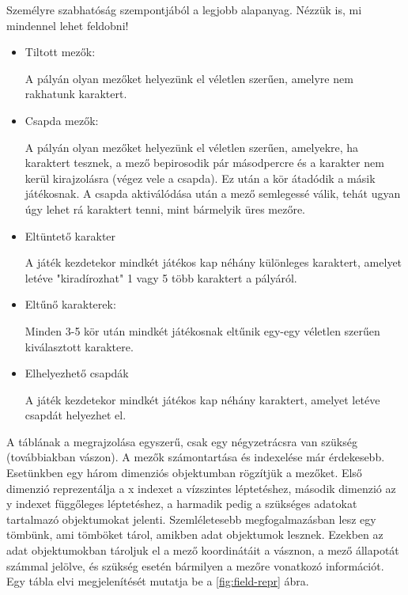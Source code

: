 
Személyre szabhatóság szempontjából a legjobb alapanyag. Nézzük is, mi mindennel lehet feldobni!
\begin{itemize}
	
	\item Tiltott mezők:
	
	A pályán olyan mezőket helyezünk el véletlen szerűen, amelyre nem rakhatunk karaktert.
	\item Csapda mezők:
	
	A pályán olyan mezőket helyezünk el véletlen szerűen, amelyekre, ha karaktert tesznek, a mező bepirosodik pár másodpercre és a karakter nem kerül kirajzolásra (végez vele a csapda). Ez után a kör átadódik a másik játékosnak. A csapda aktiválódása után a mező semlegessé válik, tehát ugyan úgy lehet rá karaktert tenni, mint bármelyik üres mezőre.
	\item Eltüntető karakter
	
	A játék kezdetekor mindkét játékos kap néhány különleges karaktert, amelyet letéve "kiradírozhat" 1 vagy 5 több karaktert a pályáról.
	\item Eltűnő karakterek:
	
	Minden 3-5 kör után mindkét játékosnak eltűnik egy-egy véletlen szerűen kiválasztott karaktere.	
	\item Elhelyezhető csapdák
	
	A játék kezdetekor mindkét játékos kap néhány karaktert, amelyet letéve csapdát helyezhet el.	
\end{itemize}


A táblának a megrajzolása egyszerű, csak egy négyzetrácsra van szükség (továbbiakban vászon). A mezők számontartása és indexelése már érdekesebb. Esetünkben egy három dimenziós objektumban rögzítjük a mezőket. Első dimenzió reprezentálja a x indexet a vízszintes léptetéshez, második dimenzió az y indexet függőleges léptetéshez, a harmadik pedig a szükséges adatokat tartalmazó objektumokat jelenti. Szemléletesebb megfogalmazásban lesz egy tömbünk, ami tömböket tárol, amikben adat objektumok lesznek. Ezekben az adat objektumokban tároljuk el a mező koordinátáit a vásznon, a mező állapotát számmal jelölve, és szükség esetén bármilyen a mezőre vonatkozó információt. Egy tábla elvi megjelenítését mutatja be a \ref{fig:field-repr} ábra.

